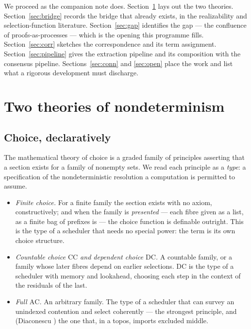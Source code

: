 \documentclass[11pt]{article}
\theoremstyle{definition}
\theoremstyle{plain}
\theoremstyle{remark}
\newcommand{\AC}{\mathrm{AC}}
\newcommand{\DC}{\mathrm{DC}}
\newcommand{\CC}{\mathrm{CC}}
\begin{document}
We proceed as the companion note does. Section~\ref{sec:two} lays out the two theories.
Section~\ref{sec:bridge} records the bridge that already exists, in the realizability and
selection-function literature. Section~\ref{sec:gap} identifies the gap --- the confluence of
proofs-as-processes --- which is the opening this programme fills. Section~\ref{sec:corr}
sketches the correspondence and its term assignment. Section~\ref{sec:pipeline} gives the
extraction pipeline and its composition with the consensus pipeline. Sections~\ref{sec:conn}
and \ref{sec:open} place the work and list what a rigorous development must discharge.

\section{Two theories of nondeterminism}\label{sec:two}

\subsection{Choice, declaratively}

The mathematical theory of choice is a graded family of principles asserting that a section
exists for a family of nonempty sets. We read each principle as a \emph{type}: a specification
of the nondeterministic resolution a computation is permitted to assume.

\begin{itemize}[leftmargin=1.4em]
\item \emph{Finite choice.} For a finite family the section exists with no axiom, constructively;
and when the family is \emph{presented} --- each fibre given as a list, as a finite bag of
prefixes is --- the choice function is definable outright. This is the type of a scheduler that
needs no special power: the term is its own choice structure.
\item \emph{Countable choice $\CC$ and dependent choice $\DC$.} A countable family, or a family
whose later fibres depend on earlier selections. $\DC$ is the type of a scheduler with memory and
lookahead, choosing each step in the context of the residuals of the last.
\item \emph{Full $\AC$.} An arbitrary family. The type of a scheduler that can survey an
unindexed contention and select coherently --- the strongest principle, and (Diaconescu
\cite{diaconescu}) the one that, in a topos, imports excluded middle.
\end{itemize}
\end{document}
